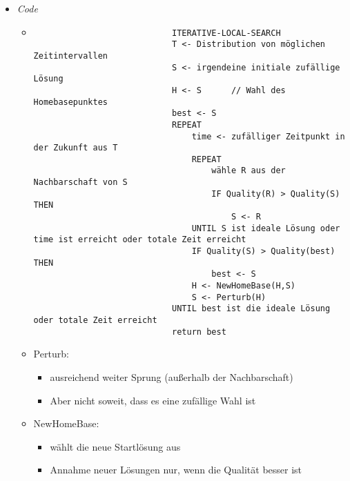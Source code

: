 \begin{itemize}
\begin{itemize}
                \item \textit{Code}
                    \begin{itemize}
                        \item[]
                            \begin{verbatim}
                            ITERATIVE-LOCAL-SEARCH
                            T <- Distribution von möglichen Zeitintervallen
                            S <- irgendeine initiale zufällige Lösung
                            H <- S      // Wahl des Homebasepunktes
                            best <- S
                            REPEAT
                                time <- zufälliger Zeitpunkt in der Zukunft aus T
                                REPEAT
                                    wähle R aus der Nachbarschaft von S
                                    IF Quality(R) > Quality(S) THEN
                                        S <- R
                                UNTIL S ist ideale Lösung oder time ist erreicht oder totale Zeit erreicht
                                IF Quality(S) > Quality(best) THEN
                                    best <- S
                                H <- NewHomeBase(H,S)
                                S <- Perturb(H)
                            UNTIL best ist die ideale Lösung oder totale Zeit erreicht
                            return best
                            \end{verbatim}
                        \item Perturb:
                            \begin{itemize}
                                \item ausreichend weiter Sprung (außerhalb der Nachbarschaft)
                                \item Aber nicht soweit, dass es eine zufällige Wahl ist
                            \end{itemize}
                        \item NewHomeBase:
                            \begin{itemize}
                                \item wählt die neue Startlösung aus
                                \item Annahme neuer Lösungen nur, wenn die Qualität besser ist
                            \end{itemize}
                    \end{itemize}
            \end{itemize}


\end{itemize}
